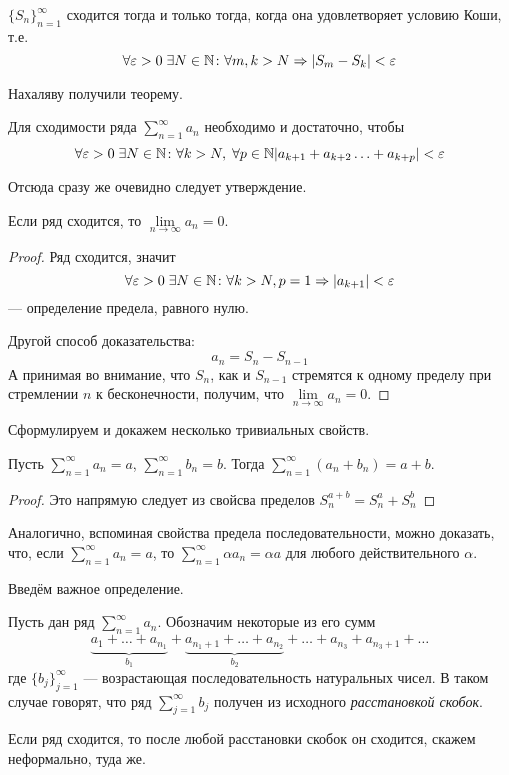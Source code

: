 \documentclass[a4paper, 12pt]{article}
\begin{document}
\begin{Examples}
	$\{S_n\}_{n=1}^\infty$ сходится тогда и только тогда, когда она удовлетворяет условию Коши, т.е.
	$$
	\forall \varepsilon>0\; \exists N\in \mathbb{N}\colon \forall m,k > N \Rightarrow |S_m - S_k|<\varepsilon
	$$
\end{Examples}
Нахаляву получили теорему.
\begin{Theorem}
	Для сходимости ряда $\sum\limits_{n=1}^{\infty} a_n$ необходимо и достаточно, чтобы 
	$$
	\forall \varepsilon>0\; \exists N\in \mathbb{N}\colon \forall k>N,\; \forall p\in \mathbb{N} |a_{k+1} + a_{k+2} \ldots + a_{k+p}| < \varepsilon
	$$
	
\end{Theorem}
Отсюда сразу же очевидно следует утверждение.
\begin{Statement}
	Если ряд сходится, то $\lim\limits_{n\to \infty} a_n = 0$.
\end{Statement}
\begin{proof}
	Ряд сходится, значит 
	$$
	\forall \varepsilon>0\; \exists N \in \mathbb{N}\colon \forall k>N, p = 1 \Rightarrow |a_{k+1}| < \varepsilon$$ --- определение предела, равного нулю.
	\par Другой способ доказательства:
	$$
	a_n = S_n - S_{n-1}$$
	А принимая во внимание, что $S_n$, как и $S_{n-1}$ стремятся к одному пределу при стремлении $n$ к бесконечности, получим, что $\lim\limits_{n \to \infty} a_n = 0$.
\end{proof}
Сформулируем и докажем несколько тривиальных свойств.
\begin{Theorem}
	Пусть $\sum\limits_{n = 1}^{\infty}a_n = a$, $\sum\limits_{n = 1}^{\infty}b_n = b$. Тогда $\sum\limits_{n = 1}^{\infty}\left(a_n + b_n\right) = a + b$.
			\end{Theorem}
			\begin{proof}
				Это напрямую следует из свойсва пределов $S^{a+b}_n = S_n^a + S_n^b$
			\end{proof}
Аналогично, вспоминая свойства предела последовательности, можно доказать, что, если $\sum\limits_{n = 1}^{\infty} a_n = a$, то $\sum\limits_{n = 1}^{\infty} \alpha a_n = \alpha a$ для любого действительного $\alpha$.

Введём важное определение.

\begin{Def}
	Пусть дан ряд $\sum\limits_{n=1}^{\infty}a_n$. Обозначим некоторые из его сумм
	$$
	\underbrace{a_1 + \ldots + a_{n_1}}_{b_1} + \underbrace{a_{n_1+1} + \ldots + a_{n_2}}_{b_2} + \ldots + a_{n_3} + a_{n_3 + 1} + \ldots
	 $$
	 где $\{b_j\}_{j=1}^{\infty}$ --- возрастающая последовательность натуральных чисел. В таком случае говорят, что ряд $\sum\limits_{j =1}^{\infty} b_j$ получен из исходного \emph{расстановкой скобок}.
\end{Def}
\begin{Statement}
	Если ряд сходится, то после любой расстановки скобок он сходится, скажем неформально, туда же.
\end{Statement}
\end{document}
